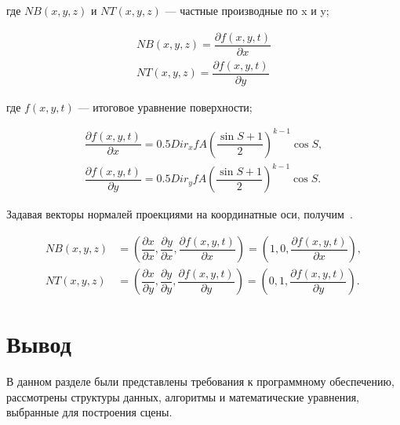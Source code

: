 где $NB(x, y, z)$ и $NT(x, y, z)$ --- частные производные по x и y;

\begin{align}
    NB(x, y, z) = \dfrac{\partial f(x,y,t)}{\partial x} \\
    NT(x, y, z) = \dfrac{\partial f(x,y,t)}{\partial y}
\end{align}

где $f(x, y, t)$ --- итоговое уравнение поверхности;

\begin{align}
    \dfrac{\partial f(x,y,t)}{\partial x} = 0.5Dir_x f A\left(\dfrac{\sin{S} + 1}{2}\right)^{k-1}\cos{S}, \\
    \dfrac{\partial f(x,y,t)}{\partial y} = 0.5Dir_y f A\left(\dfrac{\sin{S} + 1}{2}\right)^{k-1}\cos{S}.
\end{align}


Задавая векторы нормалей проекциями на координатные оси, получим~\cite{WAVE}.

\begin{align}
    NB(x, y, z) &= \left(\dfrac{\partial x}{\partial x}, \dfrac{\partial y}{\partial x}, \dfrac{\partial f(x,y,t)}{\partial x}\right) = \left(1, 0, \dfrac{\partial f(x,y,t)}{\partial x}\right), \\
    NT(x, y, z) &= \left(\dfrac{\partial x}{\partial y}, \dfrac{\partial y}{\partial y}, \dfrac{\partial f(x,y,t)}{\partial y}\right) = \left(0, 1, \dfrac{\partial f(x,y,t)}{\partial y}\right).
\end{align}

\section*{Вывод}
В данном разделе были представлены требования к программному обеспечению, рассмотрены структуры данных, алгоритмы и математические уравнения, выбранные для построения сцены.
